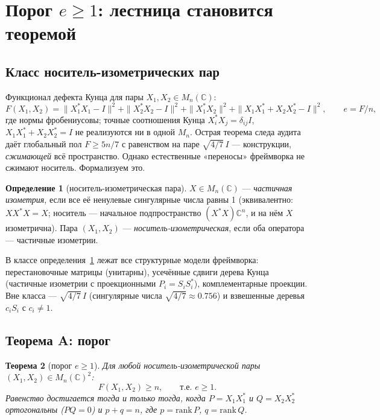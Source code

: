 \documentclass[11pt,a4paper]{article}
\newtheorem{theorem}{Теорема}[section]
\theoremstyle{definition}
\newtheorem{definition}[theorem]{Определение}
\theoremstyle{remark}
\begin{document}
\section{Порог $e \ge 1$: лестница становится теоремой}\label{sec:threshold}

\subsection{Класс носитель-изометрических пар}

Функционал дефекта Кунца для пары $X_1, X_2 \in M_n(\mathbb{C})$:
\begin{equation}\label{eq:F}
F(X_1, X_2) = \|X_1^*X_1 - I\|^2 + \|X_2^*X_2 - I\|^2
+ \|X_1^*X_2\|^2 + \|X_1X_1^* + X_2X_2^* - I\|^2,
\qquad e = F/n,
\end{equation}
где нормы фробениусовы; точные соотношения Кунца $X_i^*X_j = \delta_{ij}I$,
$X_1X_1^* + X_2X_2^* = I$ не реализуются ни в одной $M_n$. Острая теорема
следа аудита даёт глобальный пол $F \ge 5n/7$ с равенством на паре
$\sqrt{4/7}\,I$ --- конструкции, \emph{сжимающей} всё пространство. Однако
естественные «переносы» фреймворка не сжимают носитель. Формализуем это.

\begin{definition}[носитель-изометрическая пара]\label{def:carrier}
$X \in M_n(\mathbb{C})$ --- \emph{частичная изометрия}, если все её ненулевые
сингулярные числа равны 1 (эквивалентно: $XX^*X = X$; носитель --- начальное
подпространство $(X^*X)\mathbb{C}^n$, и на нём $X$ изометрична). Пара
$(X_1, X_2)$ --- \emph{носитель-изометрическая}, если оба оператора ---
частичные изометрии.
\end{definition}

В классе определения~\ref{def:carrier} лежат все структурные модели фреймворка:
перестановочные матрицы (унитарны), усечённые сдвиги дерева Кунца
(частичные изометрии с проекционными $P_i = S_iS_i^*$), комплементарные
проекции. Вне класса --- $\sqrt{4/7}\,I$ (сингулярные числа $\sqrt{4/7}
\approx 0.756$) и взвешенные деревья $c_iS_i$ с $c_i \ne 1$.

\subsection{Теорема A: порог}

\begin{theorem}[порог $e \ge 1$]\label{thm:A}
Для любой носитель-изометрической пары $(X_1, X_2) \in M_n(\mathbb{C})^2$:
\begin{equation}\label{eq:thmA}
F(X_1, X_2) \ge n, \qquad \text{т.е. } e \ge 1.
\end{equation}
Равенство достигается тогда и только тогда, когда $P = X_1X_1^*$ и
$Q = X_2X_2^*$ ортогональны ($PQ = 0$) и $p + q = n$, где $p = \mathrm{rank}\,P$,
$q = \mathrm{rank}\,Q$.
\end{theorem}
\end{document}
